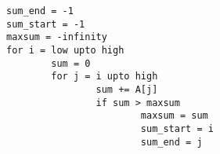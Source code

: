 \begin{verbatim}
sum_end = -1
sum_start = -1
maxsum = -infinity
for i = low upto high
        sum = 0
        for j = i upto high
                sum += A[j]
                if sum > maxsum
                        maxsum = sum
                        sum_start = i
                        sum_end = j
\end{verbatim}
